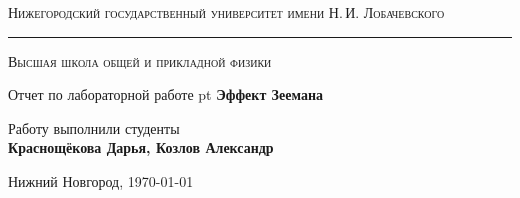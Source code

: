 \begin{titlepage}
	\begin{center}
	{\small\textsc{Нижегородский государственный университет имени Н.\,И. Лобачевского}}
	\vskip 2pt \hrule \vskip 3pt
	{\small\textsc{Высшая школа общей и прикладной физики}}

	\vfill


	{{\large Отчет по лабораторной работе} pt {\Large \bfseries Эффект Зеемана}}

		
	\vspace{2cm}
	{\large Работу выполнили студенты \\[0.5em]{\Large \bfseries Краснощёкова Дарья, Козлов Александр}}

	\end{center}

	\vfill

	\begin{center}
	{Нижний Новгород, \today}
	\end{center}
\end{titlepage}